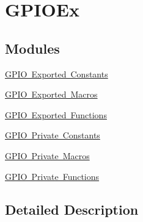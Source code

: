 \hypertarget{group___g_p_i_o_ex}{}\section{G\+P\+I\+O\+Ex}
\label{group___g_p_i_o_ex}
\subsection*{Modules}
\begin{DoxyCompactItemize}
\item 
\mbox{\hyperlink{group___g_p_i_o_ex___exported___constants}{G\+P\+I\+O Exported Constants}}
\item 
\mbox{\hyperlink{group___g_p_i_o_ex___exported___macros}{G\+P\+I\+O Exported Macros}}
\item 
\mbox{\hyperlink{group___g_p_i_o_ex___exported___functions}{G\+P\+I\+O Exported Functions}}
\item 
\mbox{\hyperlink{group___g_p_i_o_ex___private___constants}{G\+P\+I\+O Private Constants}}
\item 
\mbox{\hyperlink{group___g_p_i_o_ex___private___macros}{G\+P\+I\+O Private Macros}}
\item 
\mbox{\hyperlink{group___g_p_i_o_ex___private___functions}{G\+P\+I\+O Private Functions}}
\end{DoxyCompactItemize}


\subsection{Detailed Description}
